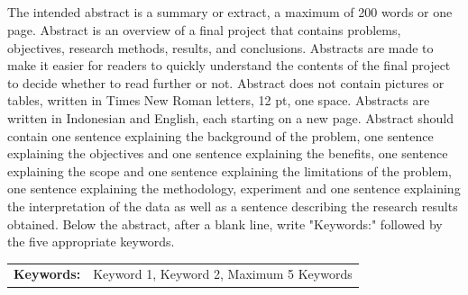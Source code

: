 
\begin{center}
\textbf{\fontsize{12pt}{0}} \\
\vspace{14pt}
\textbf{\fontsize{12pt}{0}\selectfont{Nama Mahasiswa (1xx45xxxx)}}\\
\textbf{\fontsize{12pt}{0}\selectfont{Nama Pembimbing 1 beserta gelar}}\\
\textbf{\fontsize{12pt}{0}\selectfont{Nama Pembimbing 2 beserta gelar}}\\
\vspace{36pt}
\textbf{\fontsize{12pt}{0}\selectfont{ABSTRACT}}
\end{center}
\vspace{20pt}
\singlespacing
The intended abstract is a summary or extract, a maximum of 200 words or one page. Abstract is an overview of a final project that contains problems, objectives, research methods, results, and conclusions. Abstracts are made to make it easier for readers to quickly understand the contents of the final project to decide whether to read further or not. Abstract does not contain pictures or tables, written in Times New Roman letters, 12 pt, one space. Abstracts are written in Indonesian and English, each starting on a new page. Abstract should contain one sentence explaining the background of the problem, one sentence explaining the objectives and one sentence explaining the benefits, one sentence explaining the scope and one sentence explaining the limitations of the problem, one sentence explaining the methodology, experiment and one sentence explaining the interpretation of the data as well as a sentence describing the research results obtained. Below the abstract, after a blank line, write "Keywords:" followed by the five appropriate keywords.

\singlespacing
\noindent 
\vspace{1ex}
\noindent
\begin{tabularx}{\textwidth}{@{}lX@{}}
    {\textbf{Keywords:}} & {Keyword 1, Keyword 2, Maximum 5 Keywords}
\end{tabularx}
